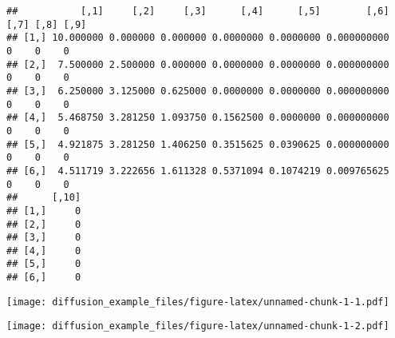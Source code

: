\documentclass[
]{article}
\newenvironment{Shaded}{\begin{snugshade}}{\end{snugshade}}
\newcommand{\CommentTok}[1]{\textcolor[rgb]{0.56,0.35,0.01}{\textit{#1}}}
\newcommand{\DataTypeTok}[1]{\textcolor[rgb]{0.13,0.29,0.53}{#1}}
\newcommand{\KeywordTok}[1]{\textcolor[rgb]{0.13,0.29,0.53}{\textbf{#1}}}
\newcommand{\NormalTok}[1]{#1}
\newcommand{\OperatorTok}[1]{\textcolor[rgb]{0.81,0.36,0.00}{\textbf{#1}}}
\newcommand{\StringTok}[1]{\textcolor[rgb]{0.31,0.60,0.02}{#1}}
\begin{document}
\begin{Shaded}
\end{Shaded}

\begin{verbatim}
##           [,1]     [,2]     [,3]      [,4]      [,5]        [,6] [,7] [,8] [,9]
## [1,] 10.000000 0.000000 0.000000 0.0000000 0.0000000 0.000000000    0    0    0
## [2,]  7.500000 2.500000 0.000000 0.0000000 0.0000000 0.000000000    0    0    0
## [3,]  6.250000 3.125000 0.625000 0.0000000 0.0000000 0.000000000    0    0    0
## [4,]  5.468750 3.281250 1.093750 0.1562500 0.0000000 0.000000000    0    0    0
## [5,]  4.921875 3.281250 1.406250 0.3515625 0.0390625 0.000000000    0    0    0
## [6,]  4.511719 3.222656 1.611328 0.5371094 0.1074219 0.009765625    0    0    0
##      [,10]
## [1,]     0
## [2,]     0
## [3,]     0
## [4,]     0
## [5,]     0
## [6,]     0
\end{verbatim}

\begin{Shaded}
\end{Shaded}

\texttt{[image: diffusion\_example\_files/figure-latex/unnamed-chunk-1-1.pdf]}

\begin{Shaded}
\end{Shaded}

\texttt{[image: diffusion\_example\_files/figure-latex/unnamed-chunk-1-2.pdf]}
\end{document}
